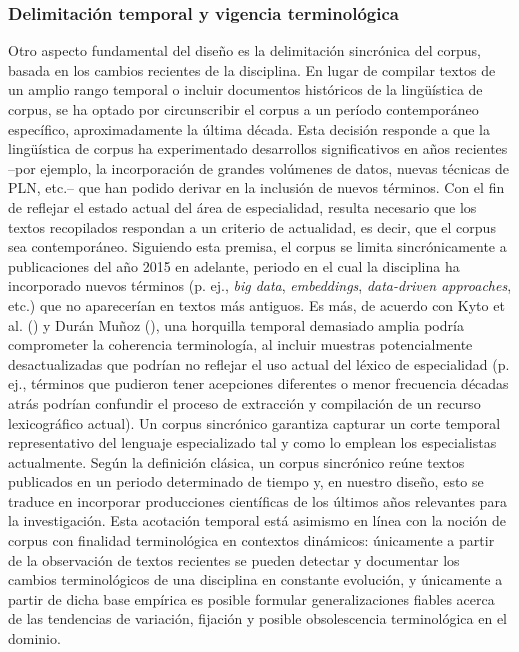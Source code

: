 \subsubsection{Delimitación temporal y vigencia terminológica}
Otro aspecto fundamental del diseño es la delimitación sincrónica del corpus, basada en los cambios recientes de la disciplina. En lugar de compilar textos de un amplio rango temporal o incluir documentos históricos de la lingüística de corpus, se ha optado por circunscribir el corpus a un período contemporáneo específico, aproximadamente la última década. Esta decisión responde a que la lingüística de corpus ha experimentado desarrollos significativos en años recientes –por ejemplo, la incorporación de grandes volúmenes de datos, nuevas técnicas de PLN, etc.– que han podido derivar en la inclusión de nuevos términos. Con el fin de reflejar el estado actual del área de especialidad, resulta necesario que los textos recopilados respondan a un criterio de actualidad, es decir, que el corpus sea contemporáneo. Siguiendo esta premisa, el corpus se limita sincrónicamente a publicaciones del año 2015 en adelante, periodo en el cual la disciplina ha incorporado nuevos términos (p. ej., \textit{big data}, \textit{embeddings}, \textit{data-driven approaches}, etc.) que no aparecerían en textos más antiguos. Es más, de acuerdo con Kyto et al. (\citeyear{kyto2000building}) y Durán Muñoz (\citeyear{duran2011trabajo}), una horquilla temporal demasiado amplia podría comprometer la coherencia terminología, al incluir muestras potencialmente desactualizadas que podrían no reflejar el uso actual del léxico de especialidad (p. ej., términos que pudieron tener acepciones diferentes o menor frecuencia décadas atrás podrían confundir el proceso de extracción y compilación de un recurso lexicográfico actual). Un corpus sincrónico garantiza capturar un corte temporal representativo del lenguaje especializado tal y como lo emplean los especialistas actualmente. Según la definición clásica, un corpus sincrónico reúne textos publicados en un periodo determinado de tiempo y, en nuestro diseño, esto se traduce en incorporar producciones científicas de los últimos años relevantes para la investigación. Esta acotación temporal está asimismo en línea con la noción de corpus con finalidad terminológica en contextos dinámicos: únicamente a partir de la observación de textos recientes se pueden detectar y documentar los cambios terminológicos de una disciplina en constante evolución, y únicamente a partir de dicha base empírica es posible formular generalizaciones fiables acerca de las tendencias de variación, fijación y posible obsolescencia terminológica en el dominio.

